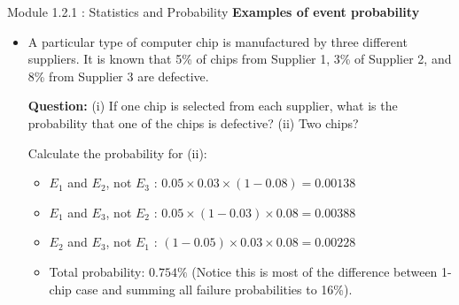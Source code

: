 \documentclass{beamer}
\begin{document}
\begin{frame}{Module 1.2.1 : Statistics and Probability}
\small
\textbf{Examples of event probability}
\begin{itemize}
\item
\scriptsize
A particular type of computer chip is manufactured by three different suppliers.  It is known that 5\% of chips from Supplier 1, 3\% of Supplier 2, and 8\% from Supplier 3 are defective. \\ \vspace{0.25cm}

\textbf{Question:} (i) If one chip is selected from each supplier, what is the probability that one of the chips is defective? (ii) Two chips? \\ \vspace{0.25cm}

Calculate the probability for (ii):
\begin{itemize}
\scriptsize
\item $E_1$ and $E_2$, not $E_3$ : $0.05 \times 0.03 \times (1-0.08) = 0.00138$
\item $E_1$ and $E_3$, not $E_2$ : $0.05 \times (1-0.03) \times 0.08 = 0.00388$
\item $E_2$ and $E_3$, not $E_1$ : $(1-0.05) \times 0.03 \times 0.08 = 0.00228$
\item Total probability: $0.754\%$ (Notice this is most of the difference between 1-chip case and summing all failure probabilities to 16\%).
\end{itemize}
\end{itemize}
\end{frame}
\end{document}
